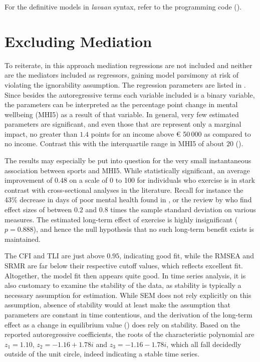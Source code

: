 For the definitive models in \textit{lavaan} syntax, refer to the programming code ().

\section{Excluding Mediation}
\label{sec:results:no_mediation}

To reiterate, in this approach mediation regressions are not included and neither are the mediators included as regressors,
gaining model parsimony at risk of violating the ignorability assumption.
The regression parameters are listed in . Since besides the autoregressive
terms each variable included is a binary variable, the parameters can be interpreted as the percentage point change
in mental wellbeing (MHI5) as a result of that variable.
In general, very few estimated parameters are significant, and even those that are represent only a marginal impact,
no greater than $1.4$ points for an income above € 50\,000 as compared to no income. Contrast this with the interquartile
range in MHI5 of about $20$ ().

The results may especially be put into question for the very small instantaneous association between sports and MHI5.
While statistically significant, an average improvement of $0.48$ on a scale of 0 to 100 for individuals who exercise
is in stark contrast with cross-sectional analyses in the literature. Recall for instance the 43\% decrease in days of poor mental
health found in , or the review by  who find effect sizes of between
$0.2$ and $0.8$ times the sample standard deviation on various measures.
The estimated long-term effect of exercise is highly insignificant ($p = 0.888$), and hence the null hypothesis that
no such long-term benefit exists is maintained.

The CFI and TLI are just above $0.95$, indicating good fit, while the RMSEA and SRMR are far below their respective
cutoff values, which reflects excellent fit. Altogether, the model fit then appears quite good.
In time series analysis, it is also customary to examine the stability of the data, as stability is typically a necessary
assumption for estimation. While SEM does not rely explicitly on this assumption, absence of stability would at least make the
assumption that parameters are constant in time contentious, and the derivation of the long-term effect as a change
in equilibrium value () does rely on stability.
Based on the reported autoregressive coefficients, the roots of the characteristic polynomial are $z_1 = 1.10$,
$z_2 = -1.16 + 1.78i$ and $z_3 = -1.16 - 1.78i$, which all fall decidedly outside of the unit circle,
indeed indicating a stable time series.

